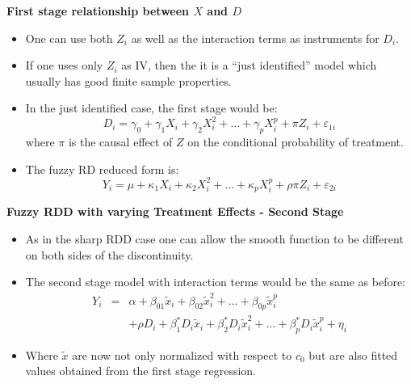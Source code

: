\documentclass[notes=show]{beamer}
\begin{document}
\begin{frame}[plain]
	\begin{center}
	\textbf{First stage relationship between $X$ and $D$}
	\end{center}
	
	\begin{itemize}
	\item One can use both $Z_i$ as well as the interaction terms as instruments for $D_i$.  
	\item If one uses only $Z_i$ as IV, then the it is a ``just identified'' model which usually has good finite sample properties. 
	\item In the just identified case, the first stage would be:$$D_i = \gamma_0 + \gamma_1X_i+\gamma_2X_i^2 + \dots + \gamma_pX_i^p + \pi{Z}_i + \varepsilon_{1i}$$where $\pi$ is the causal effect of $Z$ on the conditional probability of treatment.
	\item The fuzzy RD reduced form is:$$Y_i = \mu + \kappa_1X_i + \kappa_2X_i^2 + \dots + \kappa_pX_i^p + \rho \pi Z_i + \varepsilon_{2i}$$
	\end{itemize}
\end{frame}

\begin{frame}[plain]
	\begin{center}
	\textbf{Fuzzy RDD with varying Treatment Effects - Second Stage}
	\end{center}
	
	\begin{itemize}
	\item As in the sharp RDD case one can allow the smooth function to be different on both sides of the discontinuity.
	\item The second stage model with interaction terms would be the same as before:
		\begin{eqnarray*}
		Y_i &=& \alpha + \beta_{01}\tilde{x}_i + \beta_{02}\tilde{x}_i^2 + \dots + \beta_{0p}\tilde{x}_i^p \\
		& & + \rho D_i + \beta_1^*D_i\tilde{x}_i + \beta_2^*D_i\tilde{x}_i^2 + \dots + \beta_p^*D_i\tilde{x}_i^p + \eta_i
		\end{eqnarray*}
	\item Where $\tilde{x}$ are now not only normalized with respect to $c_0$ but are also fitted values obtained from the first stage regression.
	\end{itemize}
\end{frame}
\end{document}
